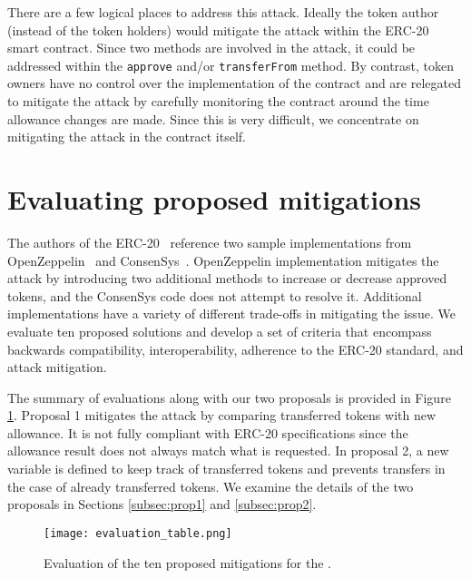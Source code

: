 There are a few logical places to address this attack. Ideally the token author (instead of the token holders) would mitigate the attack within the ERC-20 smart contract. Since two methods are involved in the attack, it could be addressed within the \texttt{approve} and/or \texttt{transferFrom} method. By contrast, token owners have no control over the implementation of the contract and are relegated to mitigate the attack by carefully monitoring the contract around the time allowance changes are made. Since this is very difficult, we concentrate on mitigating the attack in the contract itself.

\section{Evaluating proposed mitigations}
The authors of the ERC-20~\cite{Interface} reference two sample implementations from OpenZeppelin~\cite{OpenZeppelin_Token} and ConsenSys~\cite{ConsenSys_Token}. OpenZeppelin implementation mitigates the attack by introducing two additional methods to increase or decrease approved tokens, and the ConsenSys code does not attempt to resolve it. Additional implementations have a variety of different trade-offs in mitigating the issue. We evaluate ten proposed solutions and develop a set of criteria that encompass backwards compatibility, interoperability, adherence to the ERC-20 standard, and attack mitigation. 

The summary of evaluations along with our two proposals is provided in Figure \ref{fig:mitigations}. Proposal 1 mitigates the attack by comparing transferred tokens with new allowance. It is not fully compliant with ERC-20 specifications since the allowance result does not always match what is requested. In proposal 2, a new variable is defined to keep track of transferred tokens and prevents transfers in the case of already transferred tokens. We examine the details of the two proposals in Sections \ref{subsec:prop1} and \ref{subsec:prop2}.

\begin{figure}[t]
	\centering
	\texttt{[image: evaluation\_table.png]}
	\caption{Evaluation of the ten proposed mitigations for the \mwa.}
	\label{fig:mitigations}
\end{figure}

